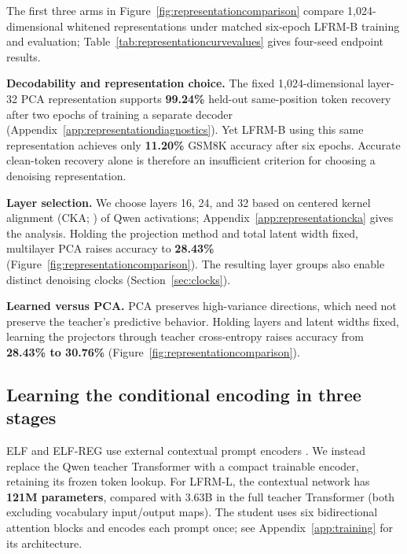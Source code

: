 \documentclass{article}
\begin{document}
The first three arms in Figure~\ref{fig:representationcomparison} compare 1,024-dimensional whitened representations under matched six-epoch LFRM-B training and evaluation; Table~\ref{tab:representationcurvevalues} gives four-seed endpoint results.

\textbf{Decodability and representation choice.}
\label{sec:representationablations}
The fixed 1,024-dimensional layer-32 PCA representation supports \textbf{99.24\%} held-out same-position token recovery after two epochs of training a separate decoder (Appendix~\ref{app:representationdiagnostics}). Yet LFRM-B using this same representation achieves only \textbf{11.20\%} GSM8K accuracy after six epochs. Accurate clean-token recovery alone is therefore an insufficient criterion for choosing a denoising representation.

\textbf{Layer selection.}
We choose layers 16, 24, and 32 based on centered kernel alignment (CKA; \citealp{cka}) of Qwen activations; Appendix~\ref{app:representationcka} gives the analysis. Holding the projection method and total latent width fixed, multilayer PCA raises accuracy to \textbf{28.43\%} (Figure~\ref{fig:representationcomparison}). The resulting layer groups also enable distinct denoising clocks (Section~\ref{sec:clocks}).

\textbf{Learned versus PCA.}
PCA preserves high-variance directions, which need not preserve the teacher's predictive behavior. Holding layers and latent widths fixed, learning the projectors through teacher cross-entropy raises accuracy from \textbf{28.43\% to 30.76\%} (Figure~\ref{fig:representationcomparison}).


\subsection{Learning the conditional encoding in three stages}
\label{sec:conditionalencoding}

ELF and ELF-REG use external contextual prompt encoders \citep{elf,scalingdlm}. We instead replace the Qwen teacher Transformer with a compact trainable encoder, retaining its frozen token lookup. For LFRM-L, the contextual network has \textbf{121M parameters}, compared with 3.63B in the full teacher Transformer (both excluding vocabulary input/output maps). The student uses six bidirectional attention blocks and encodes each prompt once; see Appendix~\ref{app:training} for its architecture.
\end{document}
